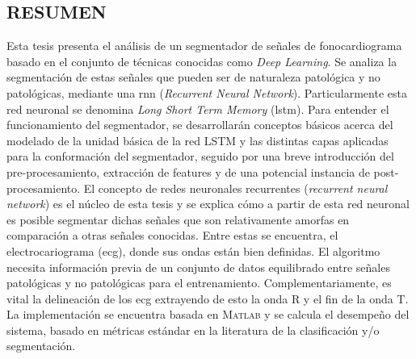 \begin{center}
\section*{\Huge{RESUMEN}}
\end{center}

Esta tesis presenta el análisis de  un segmentador de señales de fonocardiograma basado en el conjunto de técnicas
conocidas como \textit{Deep Learning}.
Se analiza la segmentación de estas señales que pueden ser de naturaleza patológica y no patológicas, mediante una
\acrshort{rnn} (\textit{Recurrent Neural Network}).
Particularmente esta red neuronal se denomina \textit{Long Short Term Memory} (\acrshort{lstm}).
Para entender el funcionamiento del segmentador, se desarrollarán conceptos básicos acerca del modelado de la unidad
básica de la red LSTM y las distintas capas aplicadas para la conformación del segmentador, seguido por una breve
introducción del pre-procesamiento, extracción de features y de una potencial instancia de post-procesamiento.
El concepto de redes neuronales recurrentes (\textit{recurrent neural network}) es
el núcleo de esta tesis y se explica cómo a partir de esta red neuronal es posible segmentar dichas señales que son
relativamente amorfas en comparación a otras señales conocidas.
Entre estas se encuentra, el electrocariograma (\acrshort{ecg}), donde sus ondas están bien definidas.
El algoritmo necesita información previa de un conjunto de datos equilibrado entre señales patológicas y no patológicas
para el entrenamiento.
Complementariamente, es vital la delineación de los \acrshort{ecg} extrayendo de esto la onda R y el fin de la onda T.
La implementación se encuentra basada en \textsc{Matlab\texttrademark} y se calcula el desempeño del sistema, basado
en métricas estándar en la literatura de la clasificación y/o segmentación.
